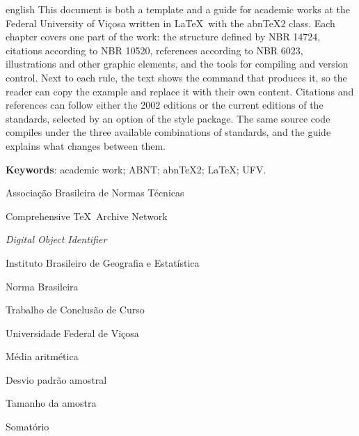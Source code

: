 \documentclass[
	12pt, %
	openright, %
	oneside, %
	a4paper, %
	sumario=tradicional, %
	english, %
	brazil, %
]{abntex2}
\begin{document}
\begin{resumo}[Abstract]
	\begin{otherlanguage*}{english}
		\noindent
		This document is both a template and a guide for academic works at the Federal University of Viçosa written in \LaTeX\ with the abn\TeX2 class. Each chapter covers one part of the work: the structure defined by NBR 14724, citations according to NBR 10520, references according to NBR 6023, illustrations and other graphic elements, and the tools for compiling and version control. Next to each rule, the text shows the command that produces it, so the reader can copy the example and replace it with their own content. Citations and references can follow either the 2002 editions or the current editions of the standards, selected by an option of the style package. The same source code compiles under the three available combinations of standards, and the guide explains what changes between them.

		\vspace{\onelineskip}
		\noindent
		\textbf{Keywords}: academic work; ABNT; abn\TeX2; \LaTeX; UFV.
	\end{otherlanguage*}
\end{resumo}

\listoffigures*
\cleardoublepage

\listofquadros*
\cleardoublepage

\listoftables*
\cleardoublepage

\begin{siglas}
	\item[ABNT] Associação Brasileira de Normas Técnicas
	\item[CTAN] Comprehensive \TeX\ Archive Network
	\item[DOI] \textit{Digital Object Identifier}
	\item[IBGE] Instituto Brasileiro de Geografia e Estatística
	\item[NBR] Norma Brasileira
	\item[TCC] Trabalho de Conclusão de Curso
	\item[UFV] Universidade Federal de Viçosa
\end{siglas}

\begin{simbolos}
	\item[$\bar{x}$] Média aritmética
	\item[$s$] Desvio padrão amostral
	\item[$n$] Tamanho da amostra
	\item[$\sum$] Somatório
\end{simbolos}
\end{document}
